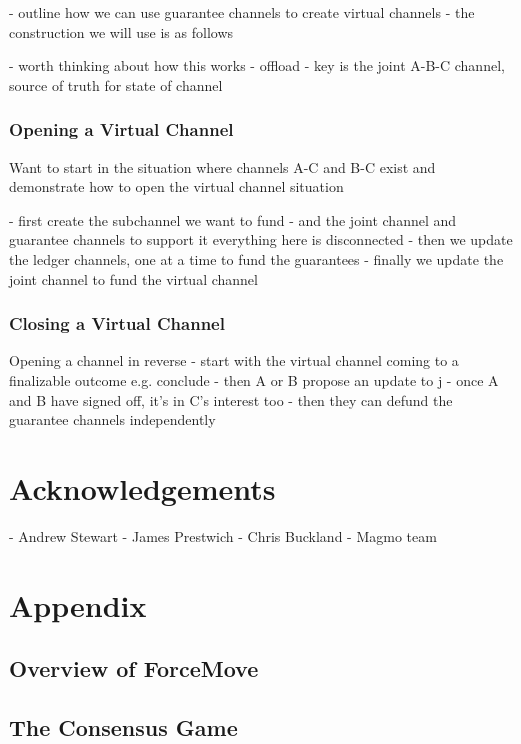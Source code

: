 \documentclass{article}
\theoremstyle{definition}
\begin{document}
- outline how we can use guarantee channels to create virtual channels
- the construction we will use is as follows



- worth thinking about how this works
- offload
- key is the joint A-B-C channel, source of truth for state of channel


\subsubsection{Opening a Virtual Channel}

Want to start in the situation where channels A-C and B-C exist and demonstrate how to
open the virtual channel situation

- first create the subchannel we want to fund
- and the joint channel and guarantee channels to support it
everything here is disconnected
- then we update the ledger channels, one at a time to fund the guarantees
- finally we update the joint channel to fund the virtual channel

\subsubsection{Closing a Virtual Channel}

Opening a channel in reverse
- start with the virtual channel coming to a finalizable outcome e.g. conclude
- then A or B propose an update to j
- once A and B have signed off, it's in C's interest too
- then they can defund the guarantee channels independently


\section{Acknowledgements}

- Andrew Stewart
- James Prestwich
- Chris Buckland
- Magmo team


\section{Appendix}

\subsection{Overview of ForceMove}
\subsection{The Consensus Game}
\end{document}
